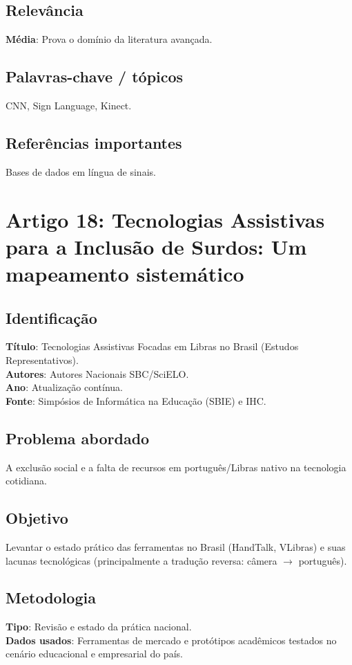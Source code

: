 \documentclass[12pt, a4paper]{article}
\begin{document}
\subsection{Relevância}
\textbf{Média}: Prova o domínio da literatura avançada.\\
\subsection{Palavras-chave / tópicos}
CNN, Sign Language, Kinect.\\
\subsection{Referências importantes}
Bases de dados em língua de sinais.
\newpage

\section{Artigo 18: Tecnologias Assistivas para a Inclusão de Surdos: Um mapeamento sistemático}
\subsection{Identificação}
\textbf{Título}: Tecnologias Assistivas Focadas em Libras no Brasil (Estudos Representativos).\\
\textbf{Autores}: Autores Nacionais SBC/SciELO.\\
\textbf{Ano}: Atualização contínua.\\
\textbf{Fonte}: Simpósios de Informática na Educação (SBIE) e IHC.\\
\subsection{Problema abordado}
A exclusão social e a falta de recursos em português/Libras nativo na tecnologia cotidiana.\\
\subsection{Objetivo}
Levantar o estado prático das ferramentas no Brasil (HandTalk, VLibras) e suas lacunas tecnológicas (principalmente a tradução reversa: câmera $\rightarrow$ português).\\
\subsection{Metodologia}
\textbf{Tipo}: Revisão e estado da prática nacional.\\
\textbf{Dados usados}: Ferramentas de mercado e protótipos acadêmicos testados no cenário educacional e empresarial do país.\\
\end{document}
